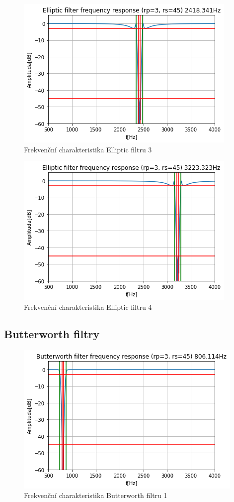 \documentclass{article}
\begin{document}
\begin{figure}[H] 
	\centering
	\includegraphics[scale=0.65,keepaspectratio]{Figure_12}
	\caption{Frekvenční charakteristika Elliptic filtru 3}
\end{figure}

\begin{figure}[H] 
	\centering
	\includegraphics[scale=0.65,keepaspectratio]{Figure_13}
	\caption{Frekvenční charakteristika Elliptic filtru 4}
\end{figure}

\subsection{Butterworth filtry}
\begin{figure}[H] 
	\centering
	\includegraphics[scale=0.65,keepaspectratio]{Figure_14}
	\caption{Frekvenční charakteristika Butterworth filtru 1}
\end{figure}
\end{document}
